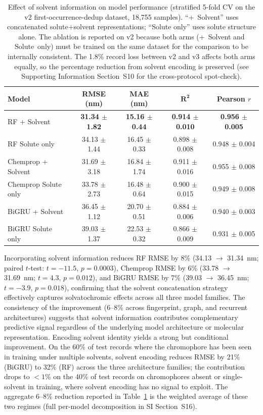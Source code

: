 \documentclass[journal=jcisd8,manuscript=article]{achemso}
\newcommand{\added}[1]{{\color{addedblue}#1}}
\newcommand{\removed}[1]{{\color{removedred}#1}}
\begin{document}
\begin{table}[htbp]
\centering
\caption{Effect of solvent information on model performance (stratified 5-fold CV \added{on the v2 first-occurrence-dedup dataset, 18{,}755 samples}). ``+~Solvent'' uses concatenated solute+solvent representations; ``Solute only'' uses solute structure alone.\added{ The ablation is reported on v2 because both arms (+~Solvent and Solute~only) must be trained on the same dataset for the comparison to be internally consistent. The 1.8\% record loss between v2 and v3 affects both arms equally, so the percentage reduction from solvent encoding is preserved (see Supporting Information Section~S10 for the cross-protocol spot-check).}}
\label{tab:solvent_ablation}
\begin{tabular}{lcccc}
\toprule
\textbf{Model} & \textbf{RMSE (nm)} & \textbf{MAE (nm)} & $\boldsymbol{R^2}$ & \textbf{Pearson $r$} \\
\midrule
RF + Solvent & \textbf{31.34 $\pm$ 1.82} & \textbf{15.16 $\pm$ 0.44} & \textbf{0.914 $\pm$ 0.010} & \textbf{0.956 $\pm$ 0.005} \\
RF Solute only & 34.13 $\pm$ 1.44 & 16.45 $\pm$ 0.33 & 0.898 $\pm$ 0.008 & 0.948 $\pm$ 0.004 \\
\midrule
Chemprop + Solvent & 31.69 $\pm$ 3.18 & 16.84 $\pm$ 1.74 & 0.911 $\pm$ 0.016 & 0.955 $\pm$ 0.008 \\
Chemprop Solute only & 33.78 $\pm$ 2.73 & 16.48 $\pm$ 0.64 & 0.900 $\pm$ 0.015 & 0.949 $\pm$ 0.008 \\
\midrule
BiGRU + Solvent & 36.45 $\pm$ 1.12 & 20.70 $\pm$ 0.51 & 0.884 $\pm$ 0.006 & 0.940 $\pm$ 0.003 \\
BiGRU Solute only & 39.03 $\pm$ 1.37 & 22.53 $\pm$ 0.32 & 0.866 $\pm$ 0.009 & 0.931 $\pm$ 0.005 \\
\bottomrule
\end{tabular}
\end{table}

Incorporating solvent information reduces RF RMSE by 8\% (34.13 $\to$ 31.34~nm; paired $t$-test: $t = -11.5$, $p = 0.0003$), Chemprop RMSE by 6\% (33.78 $\to$ 31.69~nm; $t = 4.3$, $p = 0.012$), and BiGRU RMSE by 7\% (39.03 $\to$ 36.45~nm; $t = -3.9$, $p = 0.018$), confirming that the solvent concatenation strategy effectively captures solvatochromic effects across all three model families.
\removed{The consistency of the improvement (6--8\% across fingerprint, graph, and recurrent architectures) suggests that solvent information contributes complementary predictive signal regardless of the underlying model architecture or molecular representation.}
\added{Encoding solvent identity yields a strong but conditional improvement. On the 60\% of test records where the chromophore has been seen in training under multiple solvents, solvent encoding reduces RMSE by 21\% (BiGRU) to 32\% (RF) across the three architecture families; the contribution drops to $<1$\% on the 40\% of test records on chromophores absent or single-solvent in training, where solvent encoding has no signal to exploit. The aggregate 6--8\% reduction reported in Table~\ref{tab:solvent_ablation} is the weighted average of these two regimes (full per-model decomposition in SI Section~S16).}
\end{document}
